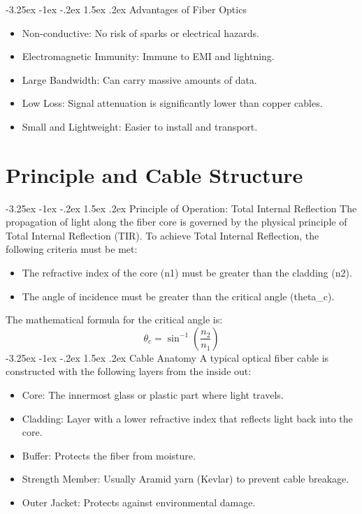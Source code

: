 \documentclass[11pt,a4paper]{report}
\makeatletter
\renewcommand{\section}{\@startsection{section}{1}{\z@}%
  {-3.25ex \@plus -1ex \@minus -.2ex}%
  {1.5ex \@plus.2ex}%
  {\normalfont\Large\bfseries\color{primaryColor}}}
\makeatother
\begin{document}
\section{Advantages of Fiber Optics}
\begin{itemize}
  \item Non-conductive: No risk of sparks or electrical hazards.
  \item Electromagnetic Immunity: Immune to EMI and lightning.
  \item Large Bandwidth: Can carry massive amounts of data.
  \item Low Loss: Signal attenuation is significantly lower than copper cables.
  \item Small and Lightweight: Easier to install and transport.
\end{itemize}
\chapter{Principle and Cable Structure}
\section{Principle of Operation: Total Internal Reflection}
The propagation of light along the fiber core is governed by the physical principle of Total Internal Reflection (TIR). To achieve Total Internal Reflection, the following criteria must be met:
\begin{itemize}
  \item The refractive index of the core (n1) must be greater than the cladding (n2).
  \item The angle of incidence must be greater than the critical angle (theta\_c).
\end{itemize}
The mathematical formula for the critical angle is:
\begin{equation}\theta_c = \sin^{-1}\left( \frac{n_2}{n_1} \right)\end{equation}
\section{Cable Anatomy}
A typical optical fiber cable is constructed with the following layers from the inside out:
\begin{itemize}
  \item Core: The innermost glass or plastic part where light travels.
  \item Cladding: Layer with a lower refractive index that reflects light back into the core.
  \item Buffer: Protects the fiber from moisture.
  \item Strength Member: Usually Aramid yarn (Kevlar) to prevent cable breakage.
  \item Outer Jacket: Protects against environmental damage.
\end{itemize}
\end{document}
